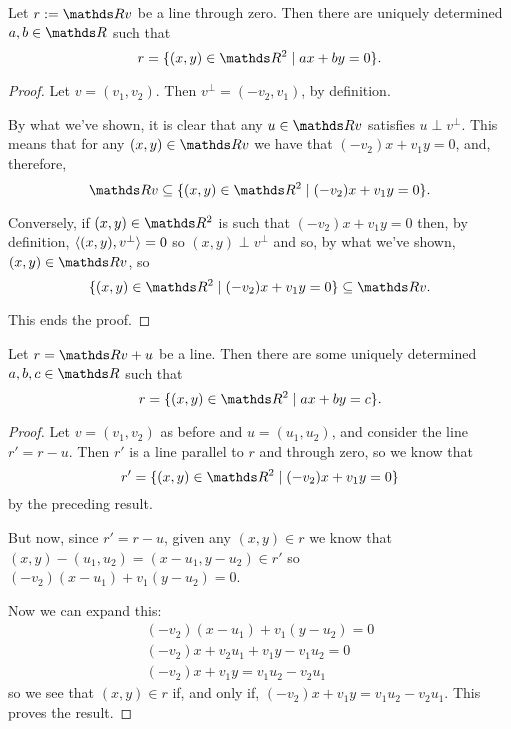 \begin{prop}
	Let $r:=\R v$ be a line through zero. Then there are uniquely determined $a,b\in \R$ such that
	\[r=\{(x,y)\in \R^2\mid ax+by=0\}.\]
\end{prop}
\begin{proof}
	Let $v=(v_1,v_2)$. Then $v^{\perp}=(-v_2,v_1)$, by definition.
	
	By what we've shown, it is clear that any $u\in \R v$ satisfies $u\perp v^\perp$. This means that for any $(x,y)\in \R v$ we have that $(-v_2)x+v_1y=0$, and, therefore, 
	\[\R v\subseteq \{(x,y)\in\R^2\mid (-v_2)x+v_1y=0\}.\]
	
	Conversely, if $(x,y)\in \R^2$ is such that $(-v_2)x+v_1y=0$ then, by definition, $\langle (x,y),v^\perp\rangle=0$ so $(x,y)\perp v^{\perp}$ and so, by what we've shown, $(x,y)\in \R v$, so
	\[\{(x,y)\in\R^2\mid (-v_2)x+v_1y=0\}\subseteq\R v.\]
	
	This ends the proof.
\end{proof}
\begin{cor}
	Let $r=\R v+u$ be a line. Then there are some uniquely determined $a,b,c\in \R$ such that
	\[r=\{(x,y)\in \R^2\mid ax+by=c\}.\]
\end{cor}
\begin{proof}
	Let $v=(v_1,v_2)$ as before and $u=(u_1,u_2)$, and consider the line $r'=r-u$. Then $r'$ is a line parallel to $r$ and through zero, so we know that
	\[r'=\{(x,y)\in \R^2\mid (-v_2)x+v_1y=0\}\]by the preceding result.
	
	But now, since $r'=r-u$, given any $(x,y)\in r$ we know that $(x,y)-(u_1,u_2)=(x-u_1,y-u_2)\in r'$ so $(-v_2)(x-u_1)+v_1(y-u_2)=0$.
	
	Now we can expand this:
	\begin{gather*}
		(-v_2)(x-u_1)+v_1(y-u_2)=0\\
		(-v_2)x+v_2u_1+v_1y-v_1u_2=0\\
		(-v_2)x+v_1y=v_1u_2-v_2u_1
	\end{gather*}so we see that $(x,y)\in r$ if, and only if, $(-v_2)x+v_1y=v_1u_2-v_2u_1$. This proves the result.
\end{proof}

